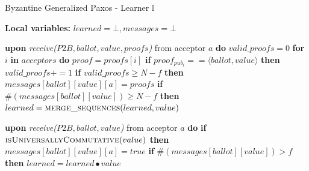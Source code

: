 \begin{algorithm}
	\caption{Byzantine Generalized Paxos - Learner l}
	\label{BFT-Learn}
	\textbf{Local variables:} $learned = \bot, messages = \bot$
	\begin{algorithmic}[1]			
		\State \textbf{upon} \textit{receive($P2B, ballot, value, proofs$)} from acceptor $a$ \textbf{do}
		\State \hspace{\algorithmicindent} $valid\_proofs = 0$
		\State \hspace{\algorithmicindent} \textbf{for} $i$ \textbf{in} $acceptors$ \textbf{do}
		\State \hspace{\algorithmicindent}\hspace{\algorithmicindent} $proof = proofs[i]$
		\State \hspace{\algorithmicindent}\hspace{\algorithmicindent} \textbf{if} $proof_{pub_i} == \langle ballot, value \rangle$ \textbf{then}
		\State \hspace{\algorithmicindent}\hspace{\algorithmicindent}\hspace{\algorithmicindent} 
		$valid\_proofs \mathrel{+{=}} 1$
		\State
		\State \hspace{\algorithmicindent} \textbf{if} $valid\_proofs \geq N-f$ \textbf{then}
		\State \hspace{\algorithmicindent}\hspace{\algorithmicindent} $messages[ballot][value][a] = proofs$
		\State
		\State \hspace{\algorithmicindent}\hspace{\algorithmicindent} \textbf{if} $\#(messages[ballot][value]) \geq N-f$ \textbf{then}
		\State \hspace{\algorithmicindent}\hspace{\algorithmicindent}\hspace{\algorithmicindent} $learned = \Call{merge\_sequences}{learned, value}$

		\State
		\State \textbf{upon} \textit{receive($P2B, ballot, value$)} from acceptor $a$ \textbf{do}
		\State \hspace{\algorithmicindent} \textbf{if} $\Call{isUniversallyCommutative}{value}$ \textbf{then}
		\State \hspace{\algorithmicindent}\hspace{\algorithmicindent}
		 $messages[ballot][value][a] = true$
		\State \hspace{\algorithmicindent}\hspace{\algorithmicindent} \textbf{if} $\#(messages[ballot][value]) > f$ \textbf{then} 
		\State \hspace{\algorithmicindent}\hspace{\algorithmicindent}\hspace{\algorithmicindent} $learned = learned \bullet value$
		

\end{algorithmic}
\end{algorithm}
